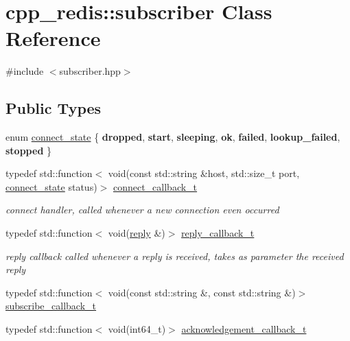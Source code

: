 \hypertarget{classcpp__redis_1_1subscriber}{}\section{cpp\+\_\+redis\+:\+:subscriber Class Reference}
\label{classcpp__redis_1_1subscriber}


{\ttfamily \#include $<$subscriber.\+hpp$>$}

\subsection*{Public Types}
\begin{DoxyCompactItemize}
\item 
enum \mbox{\hyperlink{classcpp__redis_1_1subscriber_afc976757efd9d0ac4def6935546a2338}{connect\+\_\+state}} \{ \newline
{\bfseries dropped}, 
{\bfseries start}, 
{\bfseries sleeping}, 
{\bfseries ok}, 
\newline
{\bfseries failed}, 
{\bfseries lookup\+\_\+failed}, 
{\bfseries stopped}
 \}
\item 
\mbox{\label{classcpp__redis_1_1subscriber_a7f9e56873e5b96ad9cb2395dadae1a7a}} 
typedef std\+::function$<$ void(const std\+::string \&host, std\+::size\+\_\+t port, \mbox{\hyperlink{classcpp__redis_1_1subscriber_afc976757efd9d0ac4def6935546a2338}{connect\+\_\+state}} status)$>$ \mbox{\hyperlink{classcpp__redis_1_1subscriber_a7f9e56873e5b96ad9cb2395dadae1a7a}{connect\+\_\+callback\+\_\+t}}
\begin{DoxyCompactList}\small\item\em connect handler, called whenever a new connection even occurred \end{DoxyCompactList}\item 
\mbox{\label{classcpp__redis_1_1subscriber_a5533ac876d3116911b54ff0dce28f61c}} 
typedef std\+::function$<$ void(\mbox{\hyperlink{classcpp__redis_1_1reply}{reply}} \&)$>$ \mbox{\hyperlink{classcpp__redis_1_1subscriber_a5533ac876d3116911b54ff0dce28f61c}{reply\+\_\+callback\+\_\+t}}
\begin{DoxyCompactList}\small\item\em reply callback called whenever a reply is received, takes as parameter the received reply \end{DoxyCompactList}\item 
typedef std\+::function$<$ void(const std\+::string \&, const std\+::string \&)$>$ \mbox{\hyperlink{classcpp__redis_1_1subscriber_a2ac29261280f488dab483866ae875656}{subscribe\+\_\+callback\+\_\+t}}
\item 
typedef std\+::function$<$ void(int64\+\_\+t)$>$ \mbox{\hyperlink{classcpp__redis_1_1subscriber_a19ea39dfabeb19937a9ce4c8d21781b4}{acknowledgement\+\_\+callback\+\_\+t}}
\end{DoxyCompactItemize}
